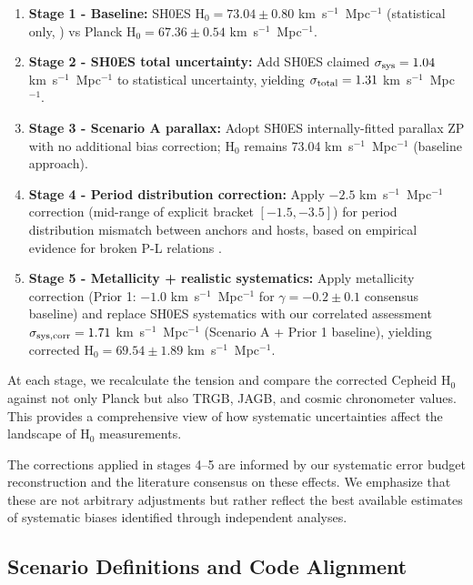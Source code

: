 \documentclass[preprint, linenumbers]{aastex701}
\begin{document}
\begin{enumerate}
\item \textbf{Stage 1 - Baseline:} SH0ES H$_0 = 73.04 \pm 0.80$ km~s$^{-1}$~Mpc$^{-1}$ (statistical only, \citealt{Riess2022}) vs Planck H$_0 = 67.36 \pm 0.54$ km~s$^{-1}$~Mpc$^{-1}$.

\item \textbf{Stage 2 - SH0ES total uncertainty:} Add SH0ES claimed $\sigma_{\rm sys} = 1.04$ km~s$^{-1}$~Mpc$^{-1}$ to statistical uncertainty, yielding $\sigma_{\rm total} = 1.31$ km~s$^{-1}$~Mpc$^{-1}$.

\item \textbf{Stage 3 - Scenario A parallax:} Adopt SH0ES internally-fitted parallax ZP with no additional bias correction; H$_0$ remains 73.04 km~s$^{-1}$~Mpc$^{-1}$ (baseline approach).

\item \textbf{Stage 4 - Period distribution correction:} Apply $-2.5$ km~s$^{-1}$~Mpc$^{-1}$ correction (mid-range of explicit bracket $[-1.5, -3.5]$) for period distribution mismatch between anchors and hosts, based on empirical evidence for broken P-L relations \citep{Ngeow2006,Kodric2015}.

\item \textbf{Stage 5 - Metallicity + realistic systematics:} Apply metallicity correction (Prior 1: $-1.0$ km~s$^{-1}$~Mpc$^{-1}$ for $\gamma=-0.2\pm0.1$ consensus baseline) and replace SH0ES systematics with our correlated assessment $\sigma_{\rm sys,corr} = 1.71$ km~s$^{-1}$~Mpc$^{-1}$ (Scenario A + Prior 1 baseline), yielding corrected H$_0 = 69.54 \pm 1.89$ km~s$^{-1}$~Mpc$^{-1}$.
\end{enumerate}

At each stage, we recalculate the tension and compare the corrected Cepheid H$_0$ against not only Planck but also TRGB, JAGB, and cosmic chronometer values. This provides a comprehensive view of how systematic uncertainties affect the landscape of H$_0$ measurements.

The corrections applied in stages 4--5 are informed by our systematic error budget reconstruction and the literature consensus on these effects. We emphasize that these are not arbitrary adjustments but rather reflect the best available estimates of systematic biases identified through independent analyses.

\subsection{Scenario Definitions and Code Alignment} \label{sec:methods_scenarios}
\end{document}
